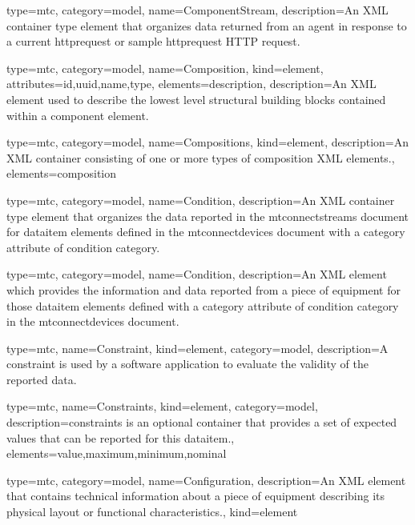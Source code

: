 {
  type=mtc,
  category=model,
  name={ComponentStream},
  description={An XML container type element that organizes data returned from an \gls{agent} in response to a \gls{current httprequest} or \gls{sample httprequest} HTTP request.} 
}


{
  type=mtc,
  category=model,
  name={Composition},
  kind={element},
  attributes={\gls{id},\gls{uuid},\gls{name},\gls{type}},
  elements={\gls{description}},
  description={An XML element used to describe the lowest level structural building blocks contained within a \gls{component} element.}
}


{
  type=mtc,
  category=model,
  name={Compositions},
  kind={element},
  description={An XML container consisting of one or more types of \gls{composition} XML elements.},
  elements={\gls{composition}}
}


{
  type=mtc,
  category=model,
  name={Condition},
  description={An XML container type element that organizes the data reported in the \gls{mtconnectstreams} document for \gls{dataitem} elements defined in the \gls{mtconnectdevices} document with a \gls{category} attribute of \gls{condition category}.}
}

{
  type=mtc,
  category=model,
  name={Condition},
  description={An XML element which provides the information and data reported from a piece of equipment for those \gls{dataitem} elements defined with a \gls{category} attribute of \gls{condition category} in the \gls{mtconnectdevices} document.}
}


{
  type=mtc,
  name={Constraint},
  kind={element},
  category=model,
  description={A \gls{constraint} is used by a software application to evaluate the validity of the reported data.}
}

{
  type=mtc,
  name={Constraints},
  kind={element},
  category=model,
  description={\gls{constraints} is an optional container that provides a set of expected values that can be reported for this \gls{dataitem}.},
  elements={\gls{value},\gls{maximum},\gls{minimum},\gls{nominal}}
}


{
  type=mtc,
  category=model,
  name={Configuration},
  description={An XML element that contains technical information about a piece of equipment describing its physical layout or functional characteristics.},
  kind={element}
}



